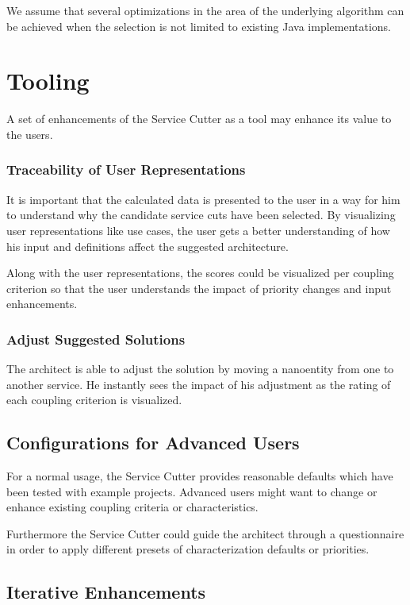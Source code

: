 We assume that several optimizations in the area of the underlying algorithm can be achieved when the selection is not limited to existing Java implementations.

\section{Tooling}

A set of enhancements of the Service Cutter as a tool may enhance its value to the users.

\subsubsection{Traceability of User Representations}

It is important that the calculated data is presented to the user in a way for him to understand why the candidate service cuts have been selected. By visualizing user representations like use cases, the user gets a better understanding of how his input and definitions affect the suggested architecture. 

Along with the user representations, the scores could be visualized per coupling criterion so that the user understands the impact of priority changes and input enhancements.

\subsubsection{Adjust Suggested Solutions}

The architect is able to adjust the solution by moving a nanoentity from one to another service. He instantly sees the impact of his adjustment as the rating of each coupling criterion is visualized.

\subsection{Configurations for Advanced Users}

For a normal usage, the Service Cutter provides reasonable defaults which have been tested with example projects. Advanced users might want to change or enhance existing coupling criteria or characteristics.

Furthermore the Service Cutter could guide the architect through a questionnaire in order to apply different presets of characterization defaults or priorities.

\subsection{Iterative Enhancements}

